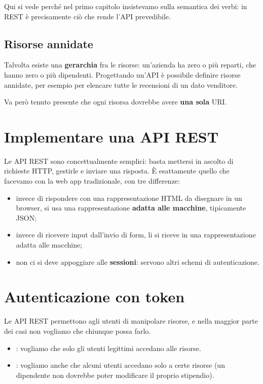 Qui si vede perché nel primo capitolo insistevamo sulla semantica dei verbi:
in REST è precisamente ciò che rende l'API prevedibile.

\subsection{Risorse annidate}

Talvolta esiste una \textbf{gerarchia} fra le risorse: un'azienda ha zero o più
reparti, che hanno zero o più dipendenti. Progettando un'API è possibile
definire risorse annidate, per esempio  per
elencare tutte le recensioni di un dato venditore.

Va però tenuto presente che ogni risorsa dovrebbe avere \textbf{una sola} URI.

\section{Implementare una API REST}

Le API REST sono concettualmente semplici: basta mettersi in ascolto di
richieste HTTP, gestirle e inviare una risposta. È esattamente quello che
facevamo con la web app tradizionale, con tre differenze:

\begin{itemize}
  \item invece di rispondere con una rappresentazione HTML da disegnare in un
        browser, si usa una rappresentazione \textbf{adatta alle macchine},
        tipicamente JSON;
  \item invece di ricevere input dall'invio di form, li si riceve in una
        rappresentazione adatta alle macchine;
  \item non ci si deve appoggiare alle \textbf{sessioni}: servono altri schemi
        di autenticazione.
\end{itemize}

\section{Autenticazione con token}

Le API REST permettono agli utenti di manipolare risorse, e nella maggior parte
dei casi non vogliamo che chiunque possa farlo.

\begin{itemize}
  \item {}: vogliamo che solo gli utenti legittimi accedano
        alle risorse.
  \item {}: vogliamo anche che alcuni utenti accedano solo a
        certe risorse (un dipendente non dovrebbe poter modificare il proprio
        stipendio).
\end{itemize}

